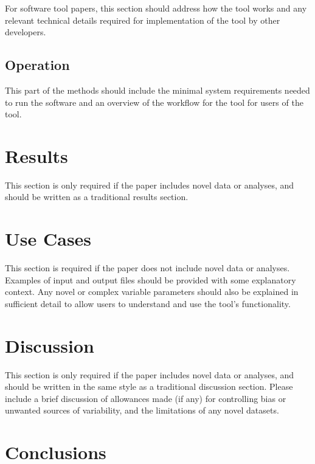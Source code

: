 \documentclass[9pt,a4paper,]{extarticle}
\begin{document}
For software tool papers, this section should address how the tool works and any relevant technical details required for implementation of the tool by other developers.

\hypertarget{operation}{%
\subsection{Operation}\label{operation}}

This part of the methods should include the minimal system requirements needed to run the software and an overview of the workflow for the tool for users of the tool.

\hypertarget{results}{%
\section{Results }\label{results}}

This section is only required if the paper includes novel data or analyses, and should be written as a traditional results section.

\hypertarget{use-cases}{%
\section{Use Cases }\label{use-cases}}

This section is required if the paper does not include novel data or analyses.
Examples of input and output files should be provided with some explanatory context. Any novel or complex variable parameters should also be explained in sufficient detail to allow users to understand and use the tool's functionality.

\hypertarget{discussion}{%
\section{Discussion }\label{discussion}}

This section is only required if the paper includes novel data or analyses, and should be written in the same style as a traditional discussion section.
Please include a brief discussion of allowances made (if any) for controlling bias or unwanted sources of variability, and the limitations of any novel datasets.

\hypertarget{conclusions}{%
\section{Conclusions }\label{conclusions}}
\end{document}
